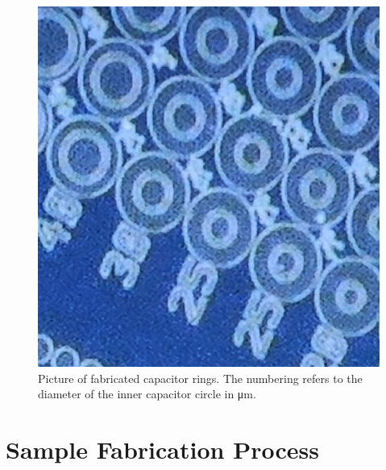 \documentclass[11pt,twoside]{eitExjobb}
\begin{document}
\begin{figure}[htbp]
    \centering
    \includegraphics[width=.30\linewidth]{fig/img/babycomputers.jpg}
    \caption{Picture of fabricated capacitor rings. The numbering refers to the
    diameter of the inner capacitor circle in
    \si{\micro\meter}.}\label{fig:fab_babycomp}
\end{figure}

%
%
%
%

\section{Sample Fabrication Process}\label{sec:FabProc}
\end{document}
